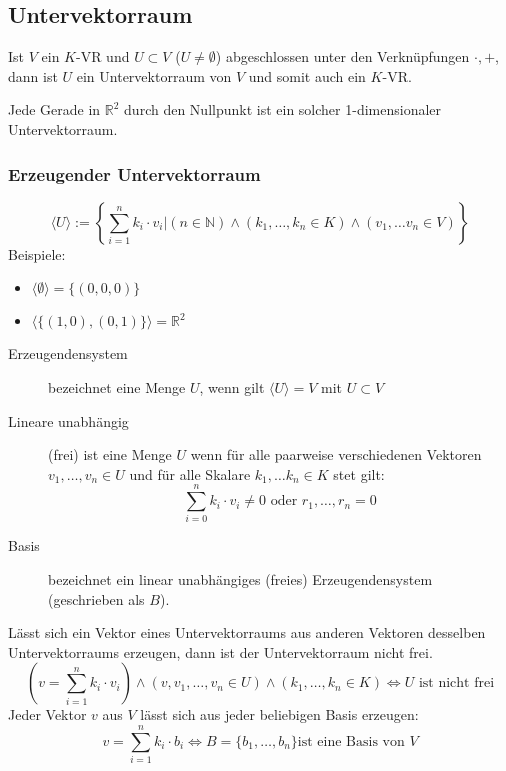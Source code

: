 \subsection{Untervektorraum}
Ist $V$ ein $K$-VR und $U \subset V$ ($U \neq \emptyset$) abgeschlossen unter den Verknüpfungen $\cdot, +$, dann ist $U$ ein Untervektorraum von $V$ und somit auch ein $K$-VR.

Jede Gerade in $\mathbb{R}^2$ durch den Nullpunkt ist ein solcher 1-dimensionaler Untervektorraum.

\subsubsection{Erzeugender Untervektorraum}
\begin{equation*}
	\langle U \rangle := \left\lbrace \sum_{i=1}^n k_i \cdot v_i | (n \in \mathbb{N}) \wedge (k_1, \dots, k_n \in K) \wedge (v_1, \dots v_n \in V) \right\rbrace
\end{equation*}
Beispiele: 
\begin{itemize}\itemsep0em
	\item $\langle \emptyset \rangle = \{(0, 0, 0)\}$
	\item $\langle\{(1, 0), (0, 1)\}\rangle = \mathbb{R}^2$
\end{itemize}

\begin{description}
	\item [Erzeugendensystem] 
	bezeichnet eine Menge $U$, wenn gilt $\langle U \rangle = V$ mit $U \subset V$

	\item [Lineare unabhängig] 
	(frei) ist eine Menge $U$ wenn für alle paarweise verschiedenen Vektoren $v_1, \dots, v_n \in U$ und für alle Skalare $k_1, \dots k_n \in K$ stet gilt:
	\begin{equation*}
		\sum_{i=0}^n k_i \cdot v_i \neq 0 \mbox{ oder } r_1, \dots, r_n = 0  
	\end{equation*}
	
	\item[Basis]
	bezeichnet ein linear unabhängiges (freies) Erzeugendensystem (geschrieben als $B$).
\end{description}
Lässt sich ein Vektor eines Untervektorraums aus anderen Vektoren desselben Untervektorraums erzeugen, dann ist der Untervektorraum nicht frei.
\begin{equation*}
	(v = \sum_{i=1}^n k_i \cdot v_i) \wedge (v, v_1, \dots, v_n \in U) \wedge (k_1, \dots, k_n \in K) \Leftrightarrow U \mbox{ ist nicht frei} 
\end{equation*}
Jeder Vektor $v$ aus $V$ lässt sich aus jeder beliebigen Basis erzeugen:
\begin{equation*}
	v = \sum_{i=1}^n k_i \cdot b_i \Leftrightarrow B = \{b_1, \dots, b_n\} \mbox{ist eine Basis von }V
\end{equation*}

